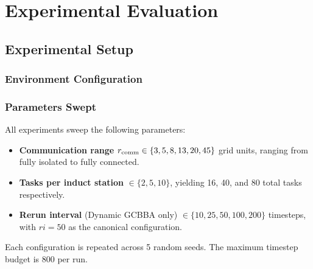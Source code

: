 \chapter{Experimental Evaluation}
\label{chap:experiments}



\section{Experimental Setup}
\label{sec:exp_setup}


\subsection{Environment Configuration}
\label{subsec:exp_environment}



\subsection{Parameters Swept}
\label{subsec:exp_parameters}

All experiments sweep the following parameters:

\begin{itemize}
  \item \textbf{Communication range} $r_{\text{comm}} \in \{3, 5, 8, 13, 20, 45\}$
        grid units, ranging from fully isolated to fully connected.
  \item \textbf{Tasks per induct station} $\in \{2, 5, 10\}$,
        yielding 16, 40, and 80 total tasks respectively.
  \item \textbf{Rerun interval} (Dynamic GCBBA only)
        $\in \{10, 25, 50, 100, 200\}$ timesteps, with $ri = 50$
        as the canonical configuration.
\end{itemize}

Each configuration is repeated across 5 random seeds.
The maximum timestep budget is 800 per run.

